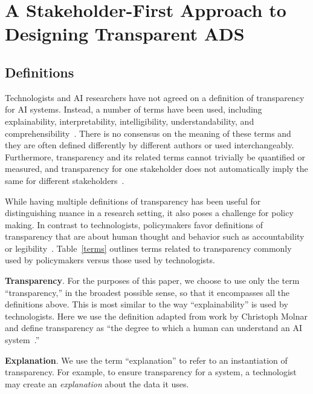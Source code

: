 \section{A Stakeholder-First Approach to Designing Transparent ADS}
\label{sec:explain}

\subsection{Definitions}

Technologists and AI researchers have not agreed on a definition of transparency for AI systems. Instead, a number of terms have been used, including explainability, interpretability, intelligibility, understandability, and comprehensibility~\cite{DBLP:journals/corr/abs-2012-01805}. There is no consensus on the meaning of these terms and they are often defined differently by different authors or used interchangeably. Furthermore, transparency and its related terms cannot trivially be quantified or measured, and transparency for one stakeholder does not automatically imply the same for different stakeholders~\cite{lipton2018mythos, hind2019explaining}.

While having multiple definitions of transparency has been useful for distinguishing nuance in a research setting, it also poses a challenge for policy making. In contrast to technologists, policymakers favor definitions of transparency that are about human thought and behavior such as accountability or legibility~\cite{DBLP:conf/aies/KrafftYKHB20}. Table~\ref{terms} outlines terms related to transparency commonly used by policymakers versus those used by technologists.

{\bf Transparency}. For the purposes of this paper, we choose to use only the term ``transparency,'' in the broadest possible sense, so that it encompasses all the definitions above. This is most similar to the way ``explainability'' is used by technologists.  Here we use the definition adapted from work by Christoph Molnar and define transparency as ``the degree to which a human can understand an AI system~\cite{molnar2019}.'' %

{\bf Explanation}. We use the term ``explanation'' to refer to an instantiation of transparency. For example, to ensure transparency for a system, a technologist may create an \emph{explanation} about the data it uses.

